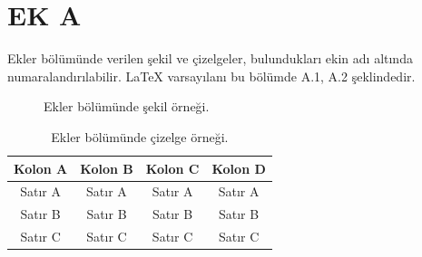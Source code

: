 \chapter*{EK A}
Ekler bölümünde verilen şekil ve çizelgeler, bulundukları ekin adı altında numaralandırılabilir. LaTeX varsayılanı bu bölümde A.1, A.2 şeklindedir.

\begin{figure}[htbp]
\centering
\fbox{\rule{0pt}{3cm}\rule{6cm}{0pt}}
\caption{Ekler bölümünde şekil örneği.}
\label{fig:ek-ornek}
\end{figure}

\begin{table}[htbp]
\caption{Ekler bölümünde çizelge örneği.}
\label{tab:ek-ornek}
\centering
\begin{tabular}{c c c c}
\toprule\toprule
Kolon A & Kolon B & Kolon C & Kolon D\\
\midrule
Satır A & Satır A & Satır A & Satır A\\
Satır B & Satır B & Satır B & Satır B\\
Satır C & Satır C & Satır C & Satır C\\
\bottomrule
\end{tabular}
\end{table}

